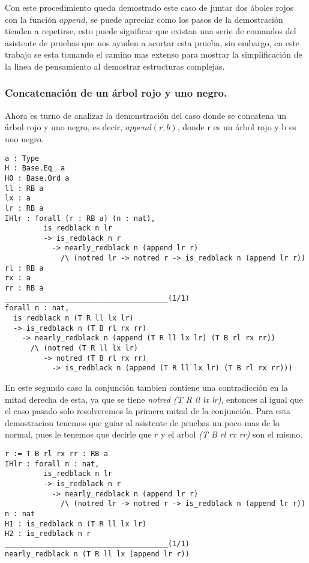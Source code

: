 Con este procedimiento queda demostrado este caso de juntar dos \'aboles rojos con la funci\'on
$append$, se puede apreciar como los pasos de la demostraci\'on tienden a repetirse, esto puede
significar que existan una serie de comandos del asistente de pruebas que nos ayuden a acortar
esta prueba, sin embargo, en este trabajo se esta tomando el camino mas extenso para mostrar la
simplificaci\'on de la linea de pensamiento al demostrar estructuras complejas.

\subsubsection{Concatenaci\'on de un \'arbol rojo y uno negro.}

Ahora es turno de analizar la demonstraci\'on del caso donde se concatena un \'arbol rojo y uno negro, es decir, $append(r,b)$, donde r es un \'arbol rojo y b es uno negro.

\begin{verbatim}
a : Type
H : Base.Eq_ a
H0 : Base.Ord a
ll : RB a
lx : a
lr : RB a
IHlr : forall (r : RB a) (n : nat),
         is_redblack n lr
         -> is_redblack n r
           -> nearly_redblack n (append lr r)
             /\ (notred lr -> notred r -> is_redblack n (append lr r))
rl : RB a
rx : a
rr : RB a
______________________________________(1/1)
forall n : nat,
  is_redblack n (T R ll lx lr)
  -> is_redblack n (T B rl rx rr)
    -> nearly_redblack n (append (T R ll lx lr) (T B rl rx rr))
      /\ (notred (T R ll lx lr)
         -> notred (T B rl rx rr)
           -> is_redblack n (append (T R ll lx lr) (T B rl rx rr)))
\end{verbatim}

En este segundo caso la conjunci\'on tambien contiene una contradicci\'on en la mitad derecha de
esta, ya que se tiene \textit{notred (T R ll lx lr)}, entonces al igual que el caso pasado solo
resolveremos la primera mitad de la conjunci\'on. Para esta demostracion tenemos que guiar al asistente de pruebas un poco mas de lo normal, pues le tenemos que decirle que $r$ y el arbol \textit{(T B rl rx rr)} son el mismo.

\begin{verbatim}
r := T B rl rx rr : RB a
IHlr : forall n : nat,
         is_redblack n lr
         -> is_redblack n r
           -> nearly_redblack n (append lr r)
             /\ (notred lr -> notred r -> is_redblack n (append lr r))
n : nat
H1 : is_redblack n (T R ll lx lr)
H2 : is_redblack n r
______________________________________(1/1)
nearly_redblack n (T R ll lx (append lr r))
\end{verbatim}


